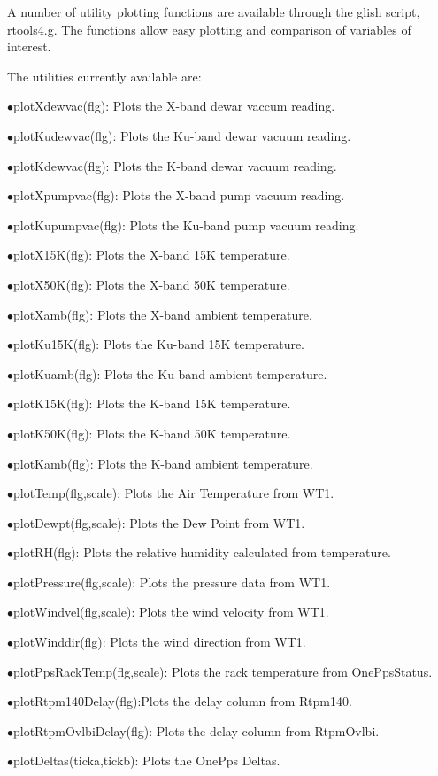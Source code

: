 A number of utility plotting functions are available through the glish
script, rtools4.g. The functions allow easy plotting and comparison
of variables of interest.

The utilities currently available are:

\begin{description}
\item{$\bullet$}plotXdewvac(flg): Plots the X-band dewar vaccum reading.
\item{$\bullet$}plotKudewvac(flg): Plots the Ku-band dewar vacuum reading.
\item{$\bullet$}plotKdewvac(flg): Plots the K-band dewar vacuum reading.
\item{$\bullet$}plotXpumpvac(flg): Plots the X-band pump vacuum reading.
\item{$\bullet$}plotKupumpvac(flg): Plots the Ku-band pump vacuum reading.
\item{$\bullet$}plotX15K(flg): Plots the X-band 15K temperature.
\item{$\bullet$}plotX50K(flg): Plots the X-band 50K temperature.
\item{$\bullet$}plotXamb(flg): Plots the X-band ambient temperature.
\item{$\bullet$}plotKu15K(flg): Plots the Ku-band 15K temperature.
\item{$\bullet$}plotKuamb(flg): Plots the Ku-band ambient temperature.
\item{$\bullet$}plotK15K(flg): Plots the K-band 15K temperature.
\item{$\bullet$}plotK50K(flg): Plots the K-band 50K temperature.
\item{$\bullet$}plotKamb(flg): Plots the K-band ambient temperature.
\item{$\bullet$}plotTemp(flg,scale): Plots the Air Temperature from WT1.
\item{$\bullet$}plotDewpt(flg,scale): Plots the Dew Point from WT1.
\item{$\bullet$}plotRH(flg): Plots the relative humidity calculated from temperature.
\item{$\bullet$}plotPressure(flg,scale): Plots the pressure data from WT1.
\item{$\bullet$}plotWindvel(flg,scale): Plots the wind velocity from WT1.
\item{$\bullet$}plotWinddir(flg): Plots the wind direction from WT1.
\item{$\bullet$}plotPpsRackTemp(flg,scale): Plots the rack temperature from OnePpsStatus.
\item{$\bullet$}plotRtpm140Delay(flg):Plots the delay column from Rtpm140.
\item{$\bullet$}plotRtpmOvlbiDelay(flg): Plots the delay column from RtpmOvlbi.
\item{$\bullet$}plotDeltas(ticka,tickb): Plots the OnePps Deltas.
\end{description}
\bigskip

